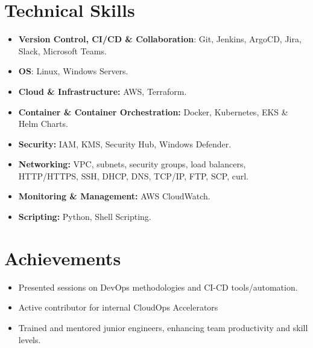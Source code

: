 \documentclass[a4paper,10pt]{article}
\newcommand{\resumeItem}[1]{
  \item\small{
    {#1 \vspace{-2pt}}
  }
}
\newcommand{\resumeSubHeadingListStart}{\begin{itemize}[leftmargin=0.15in, label={}]}
\newcommand{\resumeSubHeadingListEnd}{\end{itemize}}
\begin{document}
\section{Technical Skills}
\begin{itemize}[leftmargin=0.15in, label={}]
  \item \textbf{Version Control, CI/CD \& Collaboration}: Git, Jenkins, ArgoCD, Jira, Slack, Microsoft Teams.
  \item \textbf{OS}: Linux, Windows Servers.
  \item \textbf{Cloud \& Infrastructure:} AWS, Terraform.
  \item \textbf{Container \& Container Orchestration:} Docker, Kubernetes, EKS \& Helm Charts.
  \item \textbf{Security:} IAM, KMS, Security Hub, Windows Defender.
  \item \textbf{Networking:} VPC, subnets, security groups, load balancers, HTTP/HTTPS, SSH, DHCP, DNS, TCP/IP, FTP, SCP, curl.
  \item \textbf{Monitoring \& Management:} AWS CloudWatch.
  \item \textbf{Scripting:} Python, Shell Scripting.
\end{itemize}




\section{Achievements}
\resumeSubHeadingListStart
  \resumeItem{Presented sessions on DevOps methodologies and CI-CD tools/automation.}
  \resumeItem{Active contributor for internal CloudOps Accelerators }
  \resumeItem{Trained and mentored junior engineers, enhancing team productivity and skill levels.}
  \resumeSubHeadingListEnd
\end{document}

